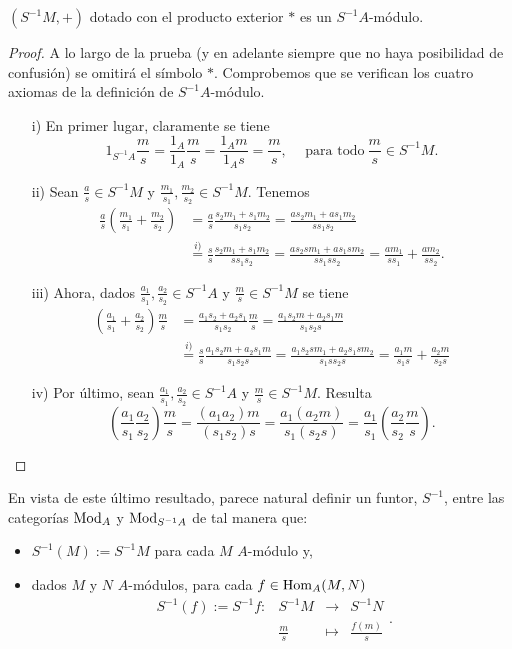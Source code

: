 \documentclass[../main.tex]{subfiles}
\begin{document}
	\begin{proposition}
		$(S^{-1}M,+)$ dotado con el producto exterior $*$ es un $S^{-1}A$-módulo.
	\end{proposition}

	\begin{proof}
		A lo largo de la prueba (y en adelante siempre que no haya posibilidad de confusión) se omitirá el símbolo $\ast$. Comprobemos que se verifican los cuatro axiomas de la definición de $S^{-1}A$-módulo.
		\begin{itemize}
			\item[i)] En primer lugar, claramente se tiene $$1_{S^{-1}A}\frac{m}{s}=\frac{1_A}{1_A}\frac{m}{s}=\frac{1_Am}{1_As}=\frac{m}{s},\hspace{15pt}\text{para todo}\ \frac{m}{s}\in S^{-1}M.$$
			\item[ii)] Sean $\frac{a}{s}\in S^{-1}M$ y $\frac{m_1}{s_1},\frac{m_2}{s_2}\in S^{-1}M$. Tenemos
			\begin{align*}
			\frac{a}{s}\left(\frac{m_1}{s_1}+\frac{m_2}{s_2}\right)&=\frac{a}{s}\frac{s_2m_1+s_1m_2}{s_1s_2}=\frac{as_2m_1+as_1m_2}{ss_1s_2}\\
			&\overset{i)}{=}\frac{s}{s}\frac{s_2m_1+s_1m_2}{ss_1s_2}=\frac{as_2sm_1+as_1sm_2}{ss_1ss_2}=\frac{am_1}{ss_1}+\frac{am_2}{ss_2}.
			\end{align*}
			\item[iii)] Ahora, dados $\frac{a_1}{s_1},\frac{a_2}{s_2}\in S^{-1}A$ y $\frac{m}{s}\in S^{-1}M$ se tiene
			\begin{align*}
			\left(\frac{a_1}{s_1}+\frac{a_2}{s_2}\right)\frac{m}{s}&=\frac{a_1s_2+a_2s_1}{s_1s_2}\frac{m}{s}=\frac{a_1s_2m+a_2s_1m}{s_1s_2s}\\
			&\overset{i)}{=}\frac{s}{s}\frac{a_1s_2m+a_2s_1m}{s_1s_2s}=\frac{a_1s_2sm_1+a_2s_1sm_2}{s_1ss_2s}=\frac{a_1m}{s_1s}+\frac{a_2m}{s_2s}
			\end{align*}
			\item[iv)] Por último, sean $\frac{a_1}{s_1},\frac{a_2}{s_2}\in S^{-1}A$ y $\frac{m}{s}\in S^{-1}M$. Resulta
			$$\left(\frac{a_1}{s_1}\frac{a_2}{s_2}\right)\frac{m}{s}=\frac{(a_1a_2)m}{(s_1s_2)s}=\frac{a_1(a_2m)}{s_1(s_2s)}=\frac{a_1}{s_1}\left(\frac{a_2}{s_2}\frac{m}{s}\right).$$
		\end{itemize}
	\end{proof}

	En vista de este último resultado, parece natural definir un funtor, $S^{-1}$, entre las categorías $\operatorname{Mod}_A$ y $\operatorname{Mod}_{S^{-1}A}$ de tal manera que:
	\begin{itemize}
		\item $S^{-1}(M):=S^{-1}M$ para cada $M$ $A$-módulo y,
		\item dados $M$ y $N$ $A$-módulos, para cada $f\in\operatorname{Hom}_A(M,N)$
		$$\begin{array}{rrcl}
		S^{-1}(f):=S^{-1}f:&S^{-1}M&\longrightarrow&S^{-1}N \\
		&\frac{m}{s}&\longmapsto&\frac{f(m)}{s}
		\end{array}.$$
	\end{itemize}
\end{document}
